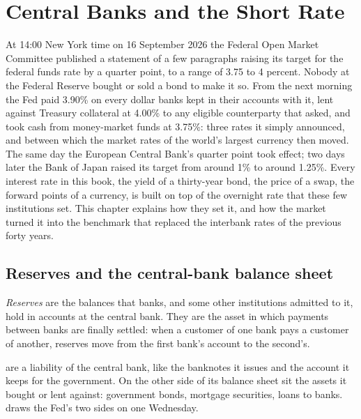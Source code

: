\chapter{Central Banks and the Short Rate}\label{ch:m2:central-banks-and-the-short-rate}

At 14:00 New York time on 16 September 2026 the Federal Open Market
Committee published a statement of a few paragraphs raising its target for
the federal funds rate by a quarter point, to a range of 3.75 to 4 percent.
Nobody at the Federal Reserve bought or sold a bond to make it so. From the
next morning the Fed paid 3.90\% on every dollar banks kept in their accounts
with it, lent against Treasury collateral at 4.00\% to any eligible
counterparty that asked, and took cash from money-market funds at 3.75\%: three rates
it simply announced, and between which the market rates of the world's
largest currency then moved. The same day the European Central Bank's quarter
point took effect; two days later the Bank of Japan raised its target from
around 1\% to around 1.25\%. Every
interest rate in this book, the yield of a thirty-year bond, the price of a
swap, the forward points of a currency, is built on top of the overnight rate
that these few institutions set. This chapter explains how they set it, and
how the market turned it into the benchmark that replaced the interbank rates
of the previous forty years.

\section{Reserves and the central-bank balance sheet}

\begin{definition}[Reserves]\label{def:m2:central-banks-and-the-short-rate:reserves}
\emph{Reserves} are the balances that banks, and some other
institutions admitted to it, hold in accounts at the central bank. They are
the asset in which payments between banks are finally settled: when a
customer of one bank pays a customer of another, reserves move from the first
bank's account to the second's.
\end{definition}

 are a liability of the central bank, like the banknotes it issues and
the account it keeps for the government. On the other side of its balance
sheet sit the assets it bought or lent against: government bonds, mortgage
securities, loans to banks. 
draws the Fed's two sides on one Wednesday.

